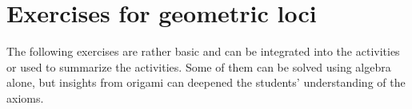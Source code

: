 

\section{Exercises for geometric loci}\label{s.exercises}

The following exercises are rather basic and can be integrated into the activities or used to summarize the activities. Some of them can be solved using algebra alone, but insights from origami can deepened the students' understanding of the axioms.

